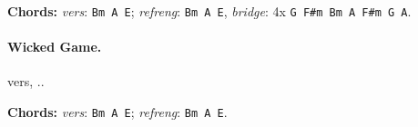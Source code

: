 \documentclass[%
twoside,                 %
final,                   %
10pt]{article}
\begin{document}
\textbf{Chords:} \emph{vers}: \Verb!Bm A E!; \emph{refreng}: \Verb!Bm A E!, \emph{bridge}: 4x
\Verb!G F#m Bm A F#m G A!.




\paragraph{Wicked Game.}
vers, ..

\textbf{Chords:} \emph{vers}: \Verb!Bm A E!; \emph{refreng}: \Verb!Bm A E!.









\printindex
\end{document}
